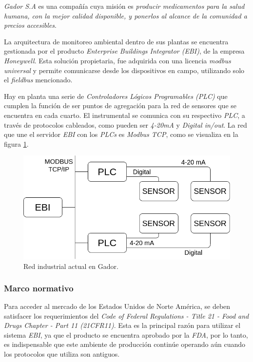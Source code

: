 			\emph{Gador S.A} es una compañía cuya misión es \emph{producir medicamentos para la salud humana, con la mejor calidad disponible, y ponerlos al alcance de la comunidad a precios accesibles}. 

			La arquitectura de monitoreo ambiental dentro de sus plantas se encuentra gestionada por el producto \emph{Enterprise Buildings Integrator (EBI)}, de la empresa \emph{Honeywell}. Esta solución propietaria, fue adquirida con una licencia \emph{modbus universal} y permite comunicarse desde los dispositivos en campo, utilizando solo el \emph{fieldbus} mencionado.

			Hay en planta una serie de \emph{Controladores Lógicos Programables (PLC)} que cumplen la función de ser puntos de agregación para la red de sensores que se encuentra en cada cuarto. El instrumental se comunica con su respectivo \emph{PLC}, a través de protocolos cableados, como pueden ser \emph{4-20mA} y \emph{Digital in/out}. La red que une el servidor \emph{EBI} con los \emph{PLCs} es \emph{Modbus TCP}, como se visualiza en la figura \ref{fig:redGador}.
			
			\begin{figure}[h]
				\centering
				\includegraphics[width=\textwidth]{./Figures/chapter1/redGador.png}
				\caption{Red industrial actual en Gador.}
				\label{fig:redGador}
			\end{figure}
		
		\subsubsection{Marco normativo}
		
			Para acceder al mercado de los Estados Unidos de Norte América, se deben satisfacer los requerimientos del \emph{Code of Federal Regulations - Title 21 - Food and Drugs Chapter - Part 11 (21CFR11)}. Esta es la principal razón para utilizar el sistema \emph{EBI}, ya que el producto se encuentra aprobado por la \emph{FDA}, por lo tanto, es indispensable que este ambiente de producción continúe operando aún cuando los protocolos que utiliza son antiguos.
			
